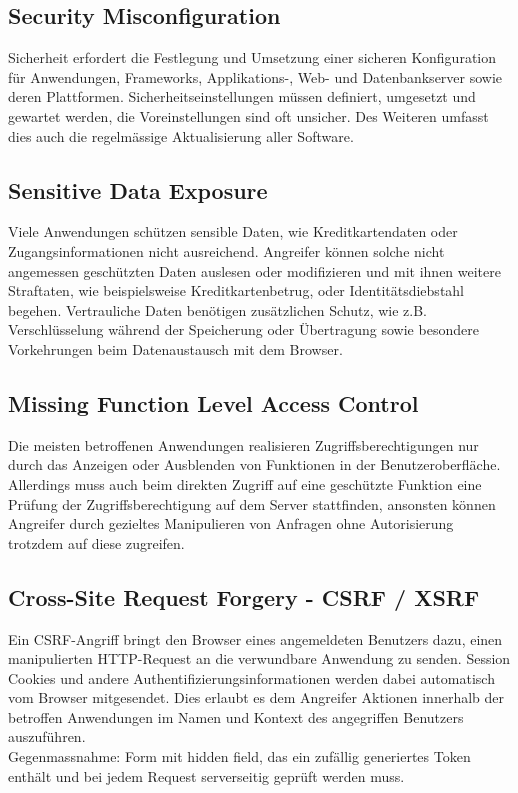 \subsection{Security Misconfiguration}
Sicherheit erfordert die Festlegung und Umsetzung einer sicheren Konfiguration für Anwendungen, Frameworks, Applikations-, Web- und Datenbankserver sowie deren Plattformen. Sicherheitseinstellungen müssen definiert, umgesetzt und gewartet werden, die Voreinstellungen sind oft unsicher. Des Weiteren umfasst dies auch die regelmässige Aktualisierung aller Software.

\subsection{Sensitive Data Exposure}
Viele Anwendungen schützen sensible Daten, wie Kreditkartendaten oder Zugangsinformationen nicht ausreichend. Angreifer können solche nicht angemessen geschützten Daten auslesen oder modifizieren und mit ihnen weitere Straftaten, wie beispielsweise Kreditkartenbetrug, oder Identitätsdiebstahl begehen. Vertrauliche Daten benötigen zusätzlichen Schutz, wie z.B. Verschlüsselung während der Speicherung oder Übertragung sowie besondere Vorkehrungen beim Datenaustausch mit dem Browser.

\subsection{Missing Function Level Access Control}
Die meisten betroffenen Anwendungen realisieren Zugriffsberechtigungen nur durch das Anzeigen oder Ausblenden von Funktionen in der Benutzeroberfläche. Allerdings muss auch beim direkten Zugriff auf eine geschützte Funktion eine Prüfung der Zugriffsberechtigung auf dem Server stattfinden, ansonsten können Angreifer durch gezieltes Manipulieren von Anfragen ohne Autorisierung trotzdem auf diese zugreifen.

\subsection{Cross-Site Request Forgery - CSRF / XSRF}
Ein CSRF-Angriff bringt den Browser eines angemeldeten Benutzers dazu, einen manipulierten HTTP-Request an die verwundbare Anwendung zu senden. Session Cookies und andere Authentifizierungsinformationen werden dabei automatisch vom Browser mitgesendet. Dies erlaubt es dem Angreifer Aktionen innerhalb der betroffen Anwendungen im Namen und Kontext des angegriffen Benutzers auszuführen.\\
Gegenmassnahme: Form mit hidden field, das ein zufällig generiertes Token enthält und bei jedem Request serverseitig geprüft werden muss.

